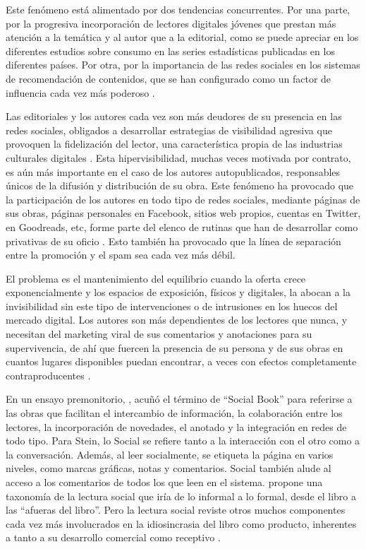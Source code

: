 \documentclass[spanish]{textolivre}
\begin{document}
Este fenómeno está alimentado por dos tendencias concurrentes. Por una parte, por la progresiva incorporación de lectores digitales jóvenes que prestan más atención a la temática y al autor que a la editorial, como se puede apreciar en los diferentes estudios sobre consumo en las series estadísticas publicadas en los diferentes países. Por otra, por la importancia de las redes sociales en los sistemas de recomendación de contenidos, que se han configurado como un factor de influencia cada vez más poderoso \cite{pianzola_wattpad_2020,pianzola_digital_2021}. 

Las editoriales y los autores cada vez son más deudores de su presencia en las redes sociales, obligados a desarrollar estrategias de visibilidad agresiva que provoquen la fidelización del lector, una característica propia de las industrias culturales digitales \cite{duhigg_power_2012}. Esta hipervisibilidad, muchas veces motivada por contrato, es aún más importante en el caso de los autores autopublicados, responsables únicos de la difusión y distribución de su obra. Este fenómeno ha provocado que la participación de los autores en todo tipo de redes sociales, mediante páginas de sus obras, páginas personales en Facebook, sitios web propios, cuentas en Twitter, en Goodreads, etc, forme parte del elenco de rutinas que han de desarrollar como privativas de su oficio \cite{lluch_claves_2018}. Esto también ha provocado que la línea de separación entre la promoción y el spam sea cada vez más débil.  

El problema es el mantenimiento del equilibrio cuando la oferta crece exponencialmente y los espacios de exposición, físicos y digitales, la abocan a la invisibilidad sin este tipo de intervenciones o de intrusiones en los huecos del mercado digital. Los autores son más dependientes de los lectores que nunca, y necesitan del marketing viral de sus comentarios y anotaciones para su supervivencia, de ahí que fuercen la presencia de su persona y de sus obras en cuantos lugares disponibles puedan encontrar, a veces con efectos completamente contraproducentes \cite{munoz_rico_bestsellers_2022}.

En un ensayo premonitorio, \textcite{stein_taxonomy_2010}, acuñó el término de “Social Book” para referirse a las obras que facilitan el intercambio de información, la colaboración entre los lectores, la incorporación de novedades, el anotado y la integración en redes de todo tipo. Para Stein, lo Social se refiere tanto a la interacción con el otro como a la conversación. Además, al leer socialmente, se etiqueta la página en varios niveles, como marcas gráficas, notas y comentarios. Social también alude al acceso a los comentarios de todos los que leen en el sistema. \textcite{stein_taxonomy_2010} propone una taxonomía de la lectura social que iría de lo informal a lo formal, desde el libro a las “afueras del libro”. Pero la lectura social reviste otros muchos componentes cada vez más involucrados en la idiosincrasia del libro como producto, inherentes a tanto a su desarrollo comercial como receptivo \cite{cruces_villalobos_como_2017}.
\end{document}
